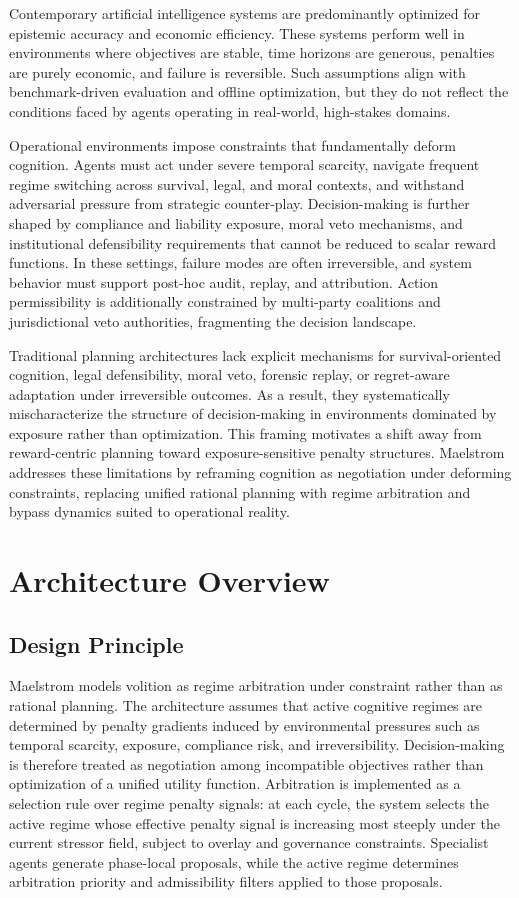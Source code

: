 \documentclass[11pt,a4paper]{article}
\begin{document}
Contemporary artificial intelligence systems are predominantly optimized for epistemic accuracy and economic efficiency. These systems perform well in environments where objectives are stable, time horizons are generous, penalties are purely economic, and failure is reversible. Such assumptions align with benchmark-driven evaluation and offline optimization, but they do not reflect the conditions faced by agents operating in real-world, high-stakes domains.

Operational environments impose constraints that fundamentally deform cognition. Agents must act under severe temporal scarcity, navigate frequent regime switching across survival, legal, and moral contexts, and withstand adversarial pressure from strategic counter-play. Decision-making is further shaped by compliance and liability exposure, moral veto mechanisms, and institutional defensibility requirements that cannot be reduced to scalar reward functions. In these settings, failure modes are often irreversible, and system behavior must support post-hoc audit, replay, and attribution. Action permissibility is additionally constrained by multi-party coalitions and jurisdictional veto authorities, fragmenting the decision landscape.

Traditional planning architectures lack explicit mechanisms for survival-oriented cognition, legal defensibility, moral veto, forensic replay, or regret-aware adaptation under irreversible outcomes. As a result, they systematically mischaracterize the structure of decision-making in environments dominated by exposure rather than optimization. This framing motivates a shift away from reward-centric planning toward exposure-sensitive penalty structures. Maelstrom addresses these limitations by reframing cognition as negotiation under deforming constraints, replacing unified rational planning with regime arbitration and bypass dynamics suited to operational reality.

\section{Architecture Overview}

\subsection{Design Principle}

Maelstrom models volition as regime arbitration under constraint rather than as rational planning. The architecture assumes that active cognitive regimes are determined by penalty gradients induced by environmental pressures such as temporal scarcity, exposure, compliance risk, and irreversibility. Decision-making is therefore treated as negotiation among incompatible objectives rather than optimization of a unified utility function. Arbitration is implemented as a selection rule over regime penalty signals: at each cycle, the system selects the active regime whose effective penalty signal is increasing most steeply under the current stressor field, subject to overlay and governance constraints. Specialist agents generate phase-local proposals, while the active regime determines arbitration priority and admissibility filters applied to those proposals.
\end{document}
